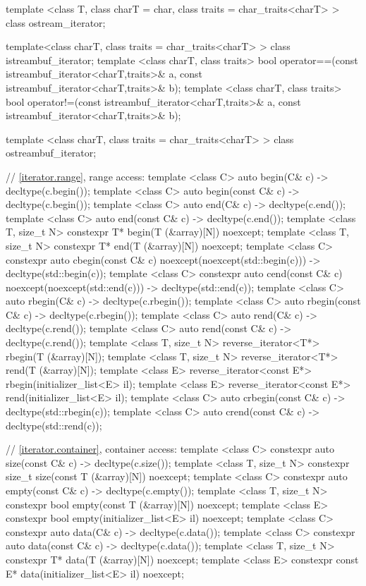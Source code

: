 \begin{codeblock}
{  template <class T, class charT = char, class traits = char_traits<charT> >
      class ostream_iterator;

  template<class charT, class traits = char_traits<charT> >
    class istreambuf_iterator;
  template <class charT, class traits>
    bool operator==(const istreambuf_iterator<charT,traits>& a,
            const istreambuf_iterator<charT,traits>& b);
  template <class charT, class traits>
    bool operator!=(const istreambuf_iterator<charT,traits>& a,
            const istreambuf_iterator<charT,traits>& b);

  template <class charT, class traits = char_traits<charT> >
    class ostreambuf_iterator;

  // \ref{iterator.range}, range access:
  template <class C> auto begin(C& c) -> decltype(c.begin());
  template <class C> auto begin(const C& c) -> decltype(c.begin());
  template <class C> auto end(C& c) -> decltype(c.end());
  template <class C> auto end(const C& c) -> decltype(c.end());
  template <class T, size_t N> constexpr T* begin(T (&array)[N]) noexcept;
  template <class T, size_t N> constexpr T* end(T (&array)[N]) noexcept;
  template <class C> constexpr auto cbegin(const C& c) noexcept(noexcept(std::begin(c)))
    -> decltype(std::begin(c));
  template <class C> constexpr auto cend(const C& c) noexcept(noexcept(std::end(c)))
    -> decltype(std::end(c));
  template <class C> auto rbegin(C& c) -> decltype(c.rbegin());
  template <class C> auto rbegin(const C& c) -> decltype(c.rbegin());
  template <class C> auto rend(C& c) -> decltype(c.rend());
  template <class C> auto rend(const C& c) -> decltype(c.rend());
  template <class T, size_t N> reverse_iterator<T*> rbegin(T (&array)[N]);
  template <class T, size_t N> reverse_iterator<T*> rend(T (&array)[N]);
  template <class E> reverse_iterator<const E*> rbegin(initializer_list<E> il);
  template <class E> reverse_iterator<const E*> rend(initializer_list<E> il);
  template <class C> auto crbegin(const C& c) -> decltype(std::rbegin(c));
  template <class C> auto crend(const C& c) -> decltype(std::rend(c));

  // \ref{iterator.container}, container access:
  template <class C> constexpr auto size(const C& c) -> decltype(c.size());
  template <class T, size_t N> constexpr size_t size(const T (&array)[N]) noexcept;
  template <class C> constexpr auto empty(const C& c) -> decltype(c.empty());
  template <class T, size_t N> constexpr bool empty(const T (&array)[N]) noexcept;
  template <class E> constexpr bool empty(initializer_list<E> il) noexcept;
  template <class C> constexpr auto data(C& c) -> decltype(c.data());
  template <class C> constexpr auto data(const C& c) -> decltype(c.data());
  template <class T, size_t N> constexpr T* data(T (&array)[N]) noexcept;
  template <class E> constexpr const E* data(initializer_list<E> il) noexcept;
}
\end{codeblock}

